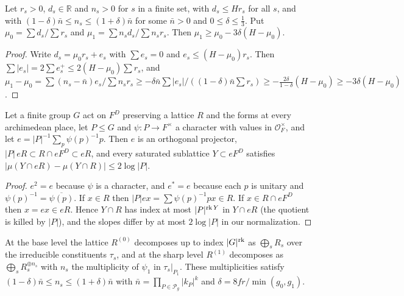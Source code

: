 \begin{lemma}[averaging]\label{w3:W3:avg}
Let $r_s>0$, $d_s\in\mathbb R$ and $n_s>0$ for $s$ in a finite set, with $d_s\le Hr_s$ for all $s$, and with $(1-\delta)\bar n\le n_s\le(1+\delta)\bar n$ for some $\bar n>0$ and $0\le\delta\le\frac13$. Put $\mu_0=\sum d_s/\sum r_s$ and $\mu_1=\sum n_sd_s/\sum n_sr_s$. Then $\mu_1\ge\mu_0-3\delta(H-\mu_0)$.
\end{lemma}

\begin{proof}
Write $d_s=\mu_0r_s+e_s$ with $\sum e_s=0$ and $e_s\le(H-\mu_0)r_s$. Then $\sum\lvert e_s\rvert=2\sum e_s^+\le2(H-\mu_0)\sum r_s$, and $\mu_1-\mu_0=\sum(n_s-\bar n)e_s/\sum n_sr_s\ge-\delta\bar n\sum\lvert e_s\rvert/((1-\delta)\bar n\sum r_s)\ge-\frac{2\delta}{1-\delta}(H-\mu_0)\ge-3\delta(H-\mu_0)$.
\end{proof}

\begin{lemma}[projectors]\label{w3:W3:proj}
Let a finite group $G$ act on $F^D$ preserving a lattice $R$ and the forms at every archimedean place, let $P\le G$ and $\psi\colon P\to F^\times$ a character with values in $\mathcal O_F^\times$, and let $e=\lvert P\rvert^{-1}\sum_{p}\psi(p)^{-1}p$. Then $e$ is an orthogonal projector, $\lvert P\rvert\,eR\subset R\cap eF^D\subset eR$, and every saturated sublattice $Y\subset eF^D$ satisfies $\lvert\mu(Y\cap eR)-\mu(Y\cap R)\rvert\le2\log\lvert P\rvert$.
\end{lemma}

\begin{proof}
$e^2=e$ because $\psi$ is a character, and $e^*=e$ because each $p$ is unitary and $\psi(p)^{-1}=\overline{\psi(p)}$. If $x\in R$ then $\lvert P\rvert ex=\sum\psi(p)^{-1}px\in R$. If $x\in R\cap eF^D$ then $x=ex\in eR$. Hence $Y\cap R$ has index at most $\lvert P\rvert^{\operatorname{rk} Y}$ in $Y\cap eR$ (the quotient is killed by $\lvert P\rvert$), and the slopes differ by at most $2\log\lvert P\rvert$ in our normalization.
\end{proof}

\begin{hypothesis}\label{w3:W3:mult}
At the base level the lattice $R^{(0)}$ decomposes up to index $\lvert G\rvert^{\operatorname{rk}}$ as $\bigoplus_sR_s$ over the irreducible constituents $\tau_s$, and at the sharp level $R^{(1)}$ decomposes as $\bigoplus_sR_s^{\oplus n_s}$ with $n_s$ the multiplicity of $\psi_1$ in $\tau_s|_{P_1}$. These multiplicities satisfy $(1-\delta)\bar n\le n_s\le(1+\delta)\bar n$ with $\bar n=\prod_{P\in\mathcal P_g}\lvert k_P\rvert^k$ and $\delta=8fr/\min(g_0,g_1)$.
\end{hypothesis}

